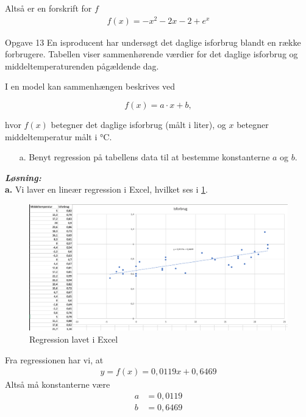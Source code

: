 \documentclass{article}
\newcommand{\sol}{\setlength{\parindent}{0cm}\textbf{\textit{Løsning:}}\setlength{\parindent}{1cm}}
\begin{document}
Altså er en forskrift for $f$
\begin{equation*}
\begin{split}
f(x)= -x^2-2x-2 + e^{x} 
\end{split}
\end{equation*}
\begin{question}{Opgave 13}{}
  En isproducent har undersøgt det daglige isforbrug blandt en række forbrugere.
Tabellen viser sammenhørende værdier for det daglige isforbrug og middeltemperaturenden pågældende dag.

I en model kan sammenhængen beskrives ved

$$f(x)=a\cdot x+b,$$

hvor $f(x)$ betegner det daglige isforbrug (målt i liter), og $x$ betegner middeltemperatur målt i $\unit{\celsius} $.
\begin{itemize}
  \item[a.] Benyt regression på tabellens data til at bestemme konstanterne $a$ og $b.$
\end{itemize}
\end{question}
\sol \\
\textbf{a.}
Vi laver en lineær regression i Excel, hvilket ses i \cref{fig:excel}.
\begin{figure}[H]
\begin{center}
  \includegraphics[scale=0.4]{excel.png}
\end{center}
\caption{Regression lavet i Excel}
\label{fig:excel}
\end{figure}
Fra regressionen har vi, at 
\begin{equation*}
\begin{split}
  y=f(x)=0,0119x + 0,6469
\end{split}
\end{equation*}
Altså må konstanterne være 
\begin{equation*}
\begin{split}
  a&=0,0119\\
  b&=0,6469
\end{split}
\end{equation*}
\end{document}
